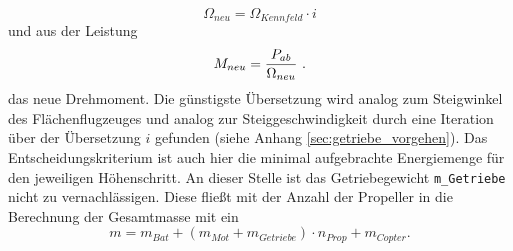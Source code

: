 \begin{equation}
	\Omega_{neu} = \Omega_{Kennfeld}\cdot i
\end{equation}
und aus der Leistung
\begin{equation}
	M_{neu} = \frac{P_{ab}}{\Omega_{neu}} ~\text{.}
\end{equation}
das neue Drehmoment.
Die günstigste Übersetzung wird analog zum Steigwinkel des Flächenflugzeuges und analog zur Steiggeschwindigkeit durch eine Iteration über der Übersetzung \ensuremath{i} gefunden (siehe Anhang \ref{sec:getriebe_vorgehen}). Das Entscheidungskriterium ist auch hier die minimal aufgebrachte Energiemenge für den jeweiligen Höhenschritt. An dieser Stelle ist das Getriebegewicht \texttt{m\_Getriebe} nicht zu vernachlässigen. Diese fließt mit der Anzahl der Propeller in die Berechnung der Gesamtmasse mit ein
\begin{equation}
	m = m_{Bat} + (m_{Mot} + m_{Getriebe})\cdot n_{Prop} + m_{Copter} .
\end{equation}

